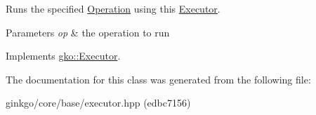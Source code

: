 Runs the specified \hyperlink{classgko_1_1Operation}{Operation} using this \hyperlink{classgko_1_1Executor}{Executor}. 


\begin{DoxyParams}{Parameters}
{\em op} & the operation to run \\
\hline
\end{DoxyParams}


Implements \hyperlink{classgko_1_1Executor_a1de8e2668b76e66690acf5eef9e8324d}{gko\+::\+Executor}.



The documentation for this class was generated from the following file\+:\begin{DoxyCompactItemize}
\item 
ginkgo/core/base/executor.\+hpp (edbc7156)\end{DoxyCompactItemize}
